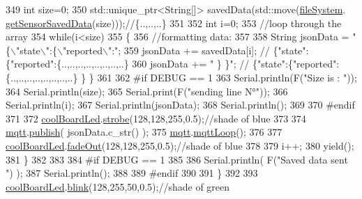 \begin{DoxyCode}
349         \textcolor{keywordtype}{int} size=0;
350         std::unique\_ptr<String[]> savedData(std::move(\hyperlink{class_cool_board_a42c2586fbb13ff7f06538e9284e8538d}{fileSystem}.
      \hyperlink{class_cool_file_system_a3223ffff4266a6300988fab956d6b4b2}{getSensorSavedData}(size)));\textcolor{comment}{//\{..,..,..\}}
351 
352         \textcolor{keywordtype}{int} i=0;
353         \textcolor{comment}{//loop through the array}
354         \textcolor{keywordflow}{while}(i<size)
355         \{
356             \textcolor{comment}{//formatting data:}
357         
358             String jsonData = \textcolor{stringliteral}{"\{\(\backslash\)"state\(\backslash\)":\{\(\backslash\)"reported\(\backslash\)":"};
359             jsonData += savedData[i]; \textcolor{comment}{// \{"state":\{"reported":\{..,..,..,..,..,..,..,..\}}
360             jsonData += \textcolor{stringliteral}{" \} \}"}; \textcolor{comment}{// \{"state":\{"reported":\{..,..,..,..,..,..,..,..\}  \} \}}
361 
362 \textcolor{preprocessor}{        #if DEBUG == 1 }
363             Serial.println(F(\textcolor{stringliteral}{"Size is : "}));
364             Serial.println(size);
365             Serial.print(F(\textcolor{stringliteral}{"sending line N°"}));
366             Serial.println(i);
367             Serial.println(jsonData);
368             Serial.println();
369 
370 \textcolor{preprocessor}{        #endif}
371 
372             \hyperlink{class_cool_board_a1b1d3c684a5baa56b08486e192fd8e97}{coolBoardLed}.\hyperlink{class_cool_board_led_ad5f0de4c628cbfbf49896042831c64ad}{strobe}(128,128,255,0.5);\textcolor{comment}{//shade of blue}
373         
374             \hyperlink{class_cool_board_a2399f44d7c23c1149a335cb3b46d90f1}{mqtt}.\hyperlink{class_cool_m_q_t_t_ace977b3e90ab14b1199fe5c4fb0a13ec}{publish}( jsonData.c\_str() );
375             \hyperlink{class_cool_board_a2399f44d7c23c1149a335cb3b46d90f1}{mqtt}.\hyperlink{class_cool_m_q_t_t_aa5eaae967b562b62cbcf2b8d81f6e5d5}{mqttLoop}();
376         
377             \hyperlink{class_cool_board_a1b1d3c684a5baa56b08486e192fd8e97}{coolBoardLed}.\hyperlink{class_cool_board_led_a93d545679237e8cc858324367149775c}{fadeOut}(128,128,255,0.5);\textcolor{comment}{//shade of blue}
378             
379             i++;
380             yield();
381         \}       
382 
383 
384 \textcolor{preprocessor}{    #if DEBUG == 1}
385 
386         Serial.println( F(\textcolor{stringliteral}{"Saved data sent "}) );
387         Serial.println();
388     
389 \textcolor{preprocessor}{    #endif}
390 
391     \}
392 
393     \hyperlink{class_cool_board_a1b1d3c684a5baa56b08486e192fd8e97}{coolBoardLed}.\hyperlink{class_cool_board_led_a96e1ea13003eee34c9dbcef340404426}{blink}(128,255,50,0.5);\textcolor{comment}{//shade of green}

\end{DoxyCode}
